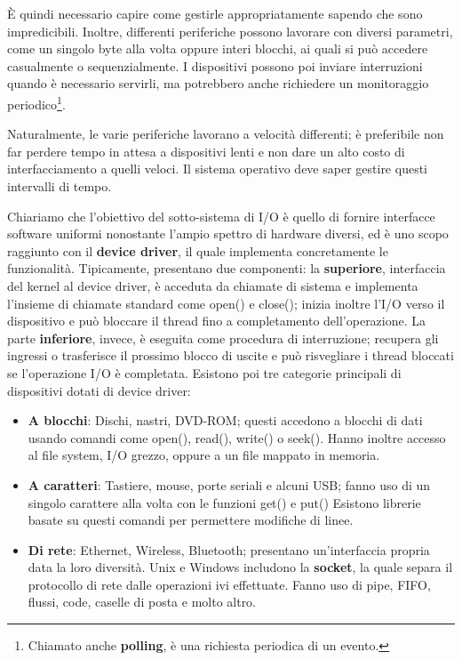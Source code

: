 \noindent È quindi necessario capire come gestirle appropriatamente sapendo che sono impredicibili. Inoltre, differenti periferiche possono lavorare con
diversi parametri, come un singolo byte alla volta oppure interi blocchi, ai quali si può accedere casualmente o sequenzialmente. I dispositivi possono
poi inviare interruzioni quando è necessario servirli, ma potrebbero anche richiedere un monitoraggio periodico\footnote{Chiamato anche \textbf{polling},
è una richiesta periodica di un evento.}.\par
Naturalmente, le varie periferiche lavorano a velocità differenti; è preferibile non far perdere tempo in attesa a dispositivi lenti e non dare un alto
costo di interfacciamento a quelli veloci. Il sistema operativo deve saper gestire questi intervalli di tempo.\par
Chiariamo che l'obiettivo del sotto-sistema di I/O è quello di fornire interfacce software uniformi nonostante l'ampio spettro di hardware diversi, ed è
uno scopo raggiunto con il \textbf{device driver}, il quale implementa concretamente le funzionalità. Tipicamente, presentano due componenti: la
\textbf{superiore}, interfaccia del kernel al device driver, è acceduta da chiamate di sistema e implementa l'insieme di chiamate standard come open()
e close(); inizia inoltre l'I/O verso il dispositivo e può bloccare il thread fino a completamento dell'operazione. La parte \textbf{inferiore}, invece,
è eseguita come procedura di interruzione; recupera gli ingressi o trasferisce il prossimo blocco di uscite e può risvegliare i thread bloccati se
l'operazione I/O è completata. Esistono poi tre categorie principali di dispositivi dotati di device driver: \begin{itemize}
    \item \textbf{A blocchi}: Dischi, nastri, DVD-ROM; questi accedono a blocchi di dati usando comandi come open(), read(), write() o seek(). Hanno
    inoltre accesso al file system, I/O grezzo, oppure a un file mappato in memoria.
    \item \textbf{A caratteri}: Tastiere, mouse, porte seriali e alcuni USB; fanno uso di un singolo carattere alla volta con le funzioni get() e put()
    Esistono librerie basate su questi comandi per permettere modifiche di linee.
    \item \textbf{Di rete}: Ethernet, Wireless, Bluetooth; presentano un'interfaccia propria data la loro diversità. Unix e Windows includono la
    \textbf{socket}, la quale separa il protocollo di rete dalle operazioni ivi effettuate. Fanno uso di pipe, FIFO, flussi, code, caselle di posta e
    molto altro.
\end{itemize}

